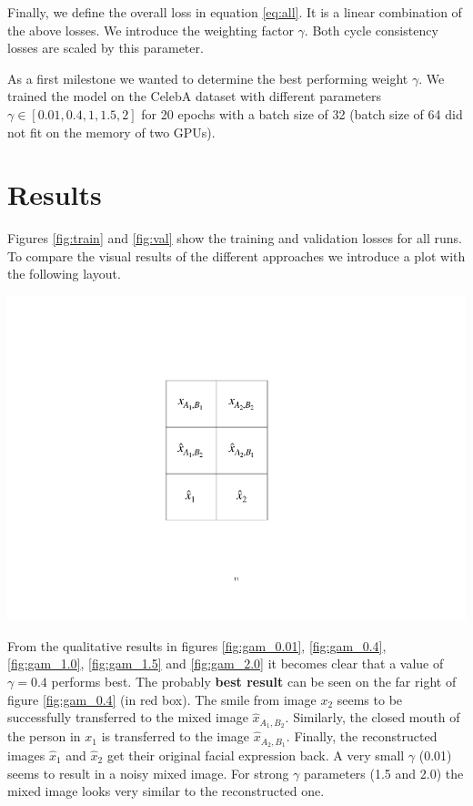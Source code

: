 \documentclass{article}
\newenvironment{Figure}
  {\par\medskip\noindent\minipage{\linewidth}}
  {\endminipage\par\medskip}
\begin{document}
\begin{multicols}{2}
Finally, we define the overall loss in equation \ref{eq:all}. It is a linear combination of the above losses. We introduce the weighting factor $\gamma$. Both cycle consistency losses are scaled by this parameter. 

As a first milestone we wanted to determine the best performing weight $\gamma$. We trained the model on the CelebA dataset \cite{liu2015faceattributes} with different parameters $\gamma \in [0.01, 0.4, 1, 1.5, 2]$ for 20 epochs with a batch size of 32 (batch size of 64 did not fit on the memory of two GPUs). 

\section{Results}
Figures \ref{fig:train} and \ref{fig:val} show the training and validation losses for all runs. To compare the visual results of the different approaches we introduce a plot with the following layout. 
\begin{Figure}
	\centering 
	\includegraphics[width=0.5\linewidth]{figures/layout.pdf}
	\label{fig:layout}
\end{Figure}

From the qualitative results in figures \ref{fig:gam_0.01}, \ref{fig:gam_0.4}, \ref{fig:gam_1.0}, \ref{fig:gam_1.5} and \ref{fig:gam_2.0} it becomes clear that a value of $\gamma = 0.4$ performs best. The probably \textbf{best result} can be seen on the far right of figure \ref{fig:gam_0.4} (in red box). The smile from image $x_2$ seems to be successfully transferred to the mixed image $\hat{x}_{A_1,B_2}$. Similarly, the closed mouth of the person in $x_1$ is transferred to the image $\hat{x}_{A_2,B_1}$. Finally, the reconstructed images $\hat{x}_1$ and $\hat{x}_2$ get their original facial expression back. A very small $\gamma$ (0.01) seems to result in a noisy mixed image. For strong $\gamma$ parameters (1.5 and 2.0) the mixed image looks very similar to the reconstructed one. 


\end{multicols}
\end{document}
